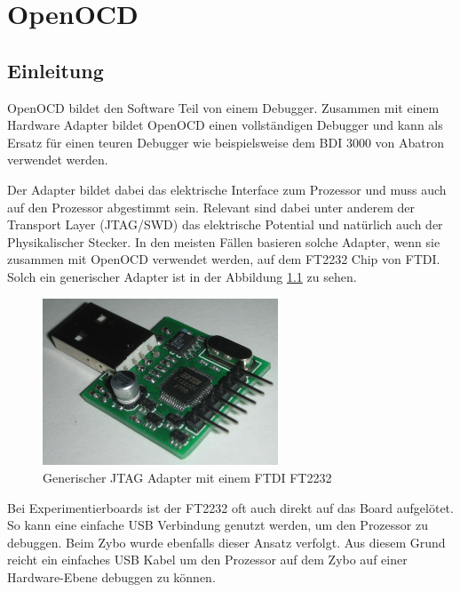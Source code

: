 \chapter{OpenOCD}
\section{Einleitung}
OpenOCD\cite{bib:OpenOCDHome} bildet den Software Teil von einem Debugger.
Zusammen mit einem Hardware Adapter bildet OpenOCD einen vollständigen Debugger und kann als Ersatz für einen teuren Debugger wie beispielsweise dem BDI 3000 von Abatron verwendet werden.

Der Adapter bildet dabei das elektrische Interface zum Prozessor und muss auch auf den Prozessor abgestimmt sein.
Relevant sind dabei unter anderem der Transport Layer (JTAG/SWD) das elektrische Potential und natürlich auch der Physikalischer Stecker.
In den meisten Fällen basieren solche Adapter, wenn sie zusammen mit OpenOCD verwendet werden, auf dem FT2232 Chip von FTDI.
Solch ein generischer Adapter ist in der Abbildung \ref{fig:GenerischerFT2232Adapter} zu sehen.

\begin{figure}[htbp]
	\centering
		\includegraphics[width=7cm,keepaspectratio]{images/JTAGAdapter.jpg}
	\caption{Generischer JTAG Adapter mit einem FTDI FT2232\cite{bib:ebayJTAGAdapter}}
	\label{fig:GenerischerFT2232Adapter}
\end{figure}

Bei Experimentierboards ist der FT2232 oft auch direkt auf das Board aufgelötet.
So kann eine einfache USB Verbindung genutzt werden, um den Prozessor zu debuggen.
Beim Zybo wurde ebenfalls dieser Ansatz verfolgt.
Aus diesem Grund reicht ein einfaches USB Kabel um den Prozessor auf dem Zybo auf einer Hardware-Ebene debuggen zu können.

